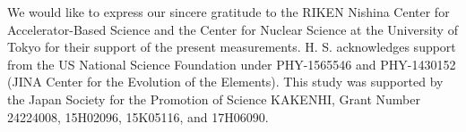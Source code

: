 \documentclass[3p]{elsarticle}
\begin{document}
We would like to express our sincere gratitude to the RIKEN Nishina Center for Accelerator-Based Science and the Center for Nuclear Science at the University of Tokyo for their support of the present measurements. H. S. acknowledges support from the US National Science Foundation under PHY-1565546 and PHY-1430152 (JINA Center for the Evolution of the Elements). This study was supported by the Japan Society for the Promotion of Science KAKENHI, Grant Number 24224008, 15H02096, 15K05116, and 17H06090.


\end{document}

